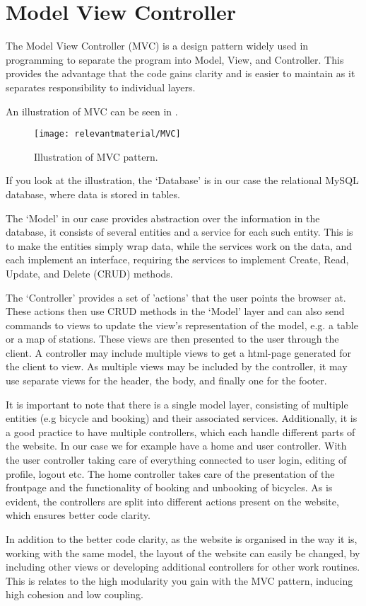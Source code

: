 \section{Model View Controller}
The Model View Controller (MVC) is a design pattern widely used in programming to separate the program into Model, View, and Controller.
This provides the advantage that the code gains clarity and is easier to maintain as it separates responsibility to individual layers.

An illustration of MVC can be seen in .
\begin{figure}[h]
	\centering
	\texttt{[image: relevantmaterial/MVC]}
	\caption{Illustration of MVC pattern.}\label{fig:MVC}
\end{figure}

If you look at the illustration, the `Database' is in our case the relational MySQL database, where data is stored in tables.

The `Model' in our case provides abstraction over the information in the database, it consists of several entities and a service for each such entity.
This is to make the entities simply wrap data, while the services work on the data, and each implement an interface, requiring the services to implement Create, Read, Update, and Delete (CRUD) methods.

The `Controller' provides a set of 'actions' that the user points the browser at. 
These actions then use CRUD methods in the `Model' layer and can also send commands to views to update the view's representation of the model, e.g. a table or a map of stations. 
These views are then presented to the user through the client.
A controller may include multiple views to get a html-page generated for the client to view.
As multiple views may be included by the controller, it may use separate views for the header, the body, and finally one for the footer.

It is important to note that there is a single model layer, consisting of multiple entities (e.g bicycle and booking) and their associated services.
Additionally, it is a good practice to have multiple controllers, which each handle different parts of the website.
In our case we for example have a home and user controller.
With the user controller taking care of everything connected to user login, editing of profile, logout etc.
The home controller takes care of the presentation of the frontpage and the functionality of booking and unbooking of bicycles.
As is evident, the controllers are split into different actions present on the website, which ensures better code clarity.

In addition to the better code clarity, as the website is organised in the way it is, working with the same model, the layout of the website can easily be changed, by including other views or developing additional controllers for other work routines.
This is relates to the high modularity you gain with the MVC pattern, inducing high cohesion and low coupling.
